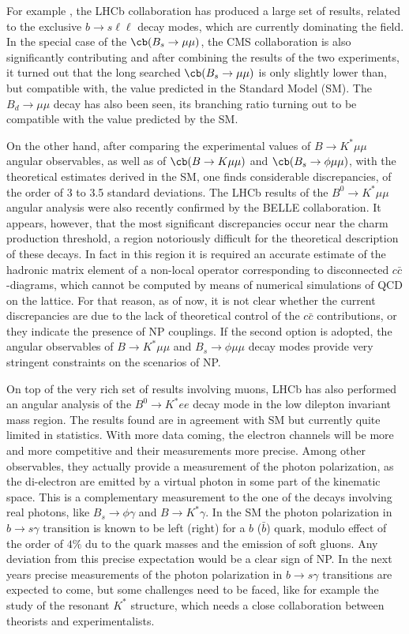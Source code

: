 For example , the LHCb collaboration has produced a large set of results, related to the exclusive $b \to s\ell \ell $ decay modes, which  are currently dominating the field.  
In the special case of the $\cb(B_s\to \mu\mu)$, the CMS collaboration is also significantly contributing and after combining the results of the two experiments, 
it turned out that the long searched $\cb(B_s\to \mu\mu)$ is only slightly lower than, but compatible with, the value
predicted in the Standard Model (SM). The $B_d\to \mu\mu$ decay has also been seen, its branching ratio turning out to be compatible with the value predicted by the SM. 
\par
On the other hand,  after comparing the experimental values of $B\to K^\ast \mu\mu$  angular observables, as well as of $\cb(B\to K \mu\mu)$ and $\cb(B_s\to \phi \mu\mu)$, with the theoretical estimates derived in the SM, 
one finds considerable discrepancies, of the order of 3 to 3.5 standard deviations.  The LHCb results of the $B^0\to K^\ast \mu\mu$  angular analysis were also recently confirmed  by the BELLE collaboration.  
It appears, however, that the most significant discrepancies occur near the charm production threshold, a region notoriously difficult for the theoretical 
description of these decays. In fact in this region it is required an accurate estimate of the hadronic matrix element of a non-local operator corresponding to disconnected $c\bar c$-diagrams, which 
cannot be computed by means of numerical simulations of QCD on the lattice. For that reason, as of now, it is not clear whether the current discrepancies are due to the lack of theoretical 
control of the $c\bar c$ contributions, or they indicate the presence of NP couplings. If the second option is adopted, the angular observables of $B\to K^\ast \mu\mu$ and $B_s\to \phi \mu\mu$ 
decay modes provide very stringent constraints on the scenarios of NP. 

On top of the very rich set of results involving muons, LHCb has also performed an angular analysis  of the $B^0\to K^\ast e e $ decay mode in the low dilepton invariant mass region. The results found  are in agreement with SM but currently quite limited in statistics.    With more data coming, the electron channels will be more and more competitive and their measurements more precise. Among other observables, they actually  provide a  measurement of the photon polarization, as the di-electron are emitted by a virtual photon in some part of the kinematic space.  This is a complementary measurement to the one of the decays involving real photons, like $B_s \to \phi \gamma$ and $B\to K^* \gamma$.  In the SM the photon polarization  in $b \to s \gamma$ transition is  known to be left (right) for a $b$ ($\bar b$) quark, modulo effect of the order of $4\%$  du to the quark masses and the emission of soft gluons. Any deviation from this precise expectation would be a clear sign of NP.  In the next years precise measurements of the photon polarization in $b \to s \gamma$ transitions are expected to come, but some challenges need to be faced, like for example the study of the resonant $K^*$ structure, which needs a close collaboration between theorists and experimentalists. 

